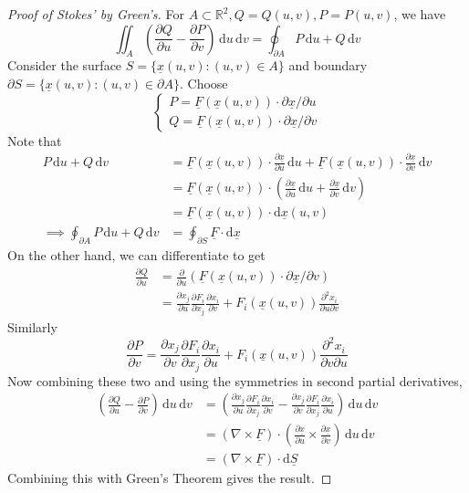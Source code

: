 \begin{proof}[Proof of Stokes' by Green's]
    For $A\subset\mathbb R^2,Q=Q(u,v),P=P(u,v)$, we have
    $$\iint_A\left( \frac{\partial Q}{\partial u}-\frac{\partial P}{\partial v} \right)\,\mathrm du\,\mathrm dv=\oint_{\partial A}P\,\mathrm du+Q\,\mathrm dv$$
    Consider the surface $S=\{\underline{x}(u,v):(u,v)\in A\}$ and boundary $\partial S=\{\underline{x}(u,v):(u,v)\in\partial A\}$.
    Choose
    $$\begin{cases}
        P=\underline{F}(\underline{x}(u,v))\cdot\partial\underline{x}/\partial u\\
        Q=\underline{F}(\underline{x}(u,v))\cdot\partial\underline{x}/\partial v
    \end{cases}$$
    Note that
    \begin{align*}
        P\,\mathrm du+Q\,\mathrm dv
        &=\underline{F}(\underline{x}(u,v))\cdot\frac{\partial\underline{x}}{\partial u}\,\mathrm du+\underline{F}(\underline{x}(u,v))\cdot\frac{\partial\underline{x}}{\partial v}\,\mathrm dv\\
        &=\underline{F}(\underline{x}(u,v))\cdot\left( \frac{\partial\underline{x}}{\partial u}\,\mathrm du+\frac{\partial\underline{x}}{\partial v}\,\mathrm dv \right)\\
        &=\underline{F}(\underline{x}(u,v))\cdot\mathrm d\underline{x}(u,v)\\
        \implies \oint_{\partial A}P\,\mathrm du+Q\,\mathrm dv&=\oint_{\partial S}\underline{F}\cdot\mathrm d\underline{x}
    \end{align*}
    On the other hand, we can differentiate to get
    \begin{align*}
        \frac{\partial Q}{\partial u}&=\frac{\partial}{\partial u}\left( \underline{F}(\underline{x}(u,v))\cdot\partial\underline{x}/\partial v \right)\\
        &=\frac{\partial x_j}{\partial u}\frac{\partial F_i}{\partial x_j}\frac{\partial x_i}{\partial v}+F_i(\underline{x}(u,v))\frac{\partial^2 x_i}{\partial u\partial v}
    \end{align*}
    Similarly
    $$\frac{\partial P}{\partial v}=\frac{\partial x_j}{\partial v}\frac{\partial F_i}{\partial x_j}\frac{\partial x_i}{\partial u}+F_i(\underline{x}(u,v))\frac{\partial^2 x_i}{\partial v\partial u}$$
    Now combining these two and using the symmetries in second partial derivatives,
    \begin{align*}
        \left(\frac{\partial Q}{\partial u}-\frac{\partial P}{\partial v}\right)\,\mathrm du\,\mathrm dv&=\left(\frac{\partial x_j}{\partial u}\frac{\partial F_i}{\partial x_j}\frac{\partial x_i}{\partial v}-\frac{\partial x_j}{\partial v}\frac{\partial F_i}{\partial x_j}\frac{\partial x_i}{\partial u}\right)\,\mathrm du\,\mathrm dv\\
        &=(\nabla\times\underline{F})\cdot\left( \frac{\partial\underline{x}}{\partial u}\times\frac{\partial\underline{x}}{\partial v} \right)\,\mathrm du\,\mathrm dv\\
        &=(\nabla\times\underline{F})\cdot\mathrm d\underline{S}
    \end{align*}
    Combining this with Green's Theorem gives the result.
\end{proof}